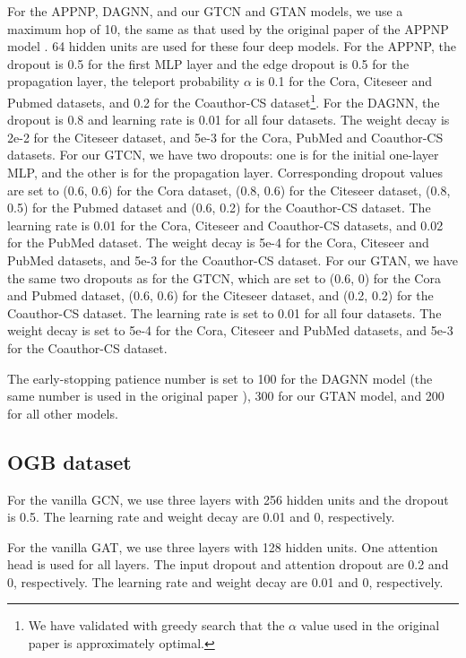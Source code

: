 \documentclass[lettersize,journal]{IEEEtran}
\theoremstyle{plain}
\theoremstyle{definition}
\theoremstyle{remark}
\begin{document}
For the APPNP, DAGNN, and our GTCN and GTAN models, we use a maximum hop of 10, the same as that used by the original paper of the APPNP model \citep{klicpera2018predict}. 64 hidden units are used for these four deep models. For the APPNP, the dropout is 0.5 for the first MLP layer and the edge dropout is 0.5 for the propagation layer, the teleport probability $\alpha$ is 0.1 for the Cora, Citeseer and Pubmed datasets, and 0.2 for the Coauthor-CS dataset\footnote{We have validated with greedy search that the $\alpha$ value used in the original paper is approximately optimal.}. For the DAGNN, the dropout is 0.8 and learning rate is 0.01 for all four datasets. The weight decay is 2e-2 for the Citeseer dataset, and 5e-3 for the Cora, PubMed and Coauthor-CS datasets. For our GTCN, we have two dropouts: one is for the initial one-layer MLP, and the other is for the propagation layer. Corresponding dropout values are set to (0.6, 0.6) for the Cora dataset, (0.8, 0.6) for the Citeseer dataset, (0.8, 0.5) for the Pubmed dataset and (0.6, 0.2) for the Coauthor-CS dataset. The learning rate is 0.01 for the Cora, Citeseer and Coauthor-CS datasets, and 0.02 for the PubMed dataset. The weight decay is 5e-4 for the Cora, Citeseer and PubMed datasets, and 5e-3 for the Coauthor-CS dataset. For our GTAN, we have the same two dropouts as for the GTCN, which are set to (0.6, 0) for the Cora and Pubmed dataset, (0.6, 0.6) for the Citeseer dataset, and (0.2, 0.2) for the Coauthor-CS dataset. The learning rate is set to 0.01 for all four datasets. The weight decay is set to 5e-4 for the Cora, Citeseer and PubMed datasets, and 5e-3 for the Coauthor-CS dataset. 

The early-stopping patience number is set to 100 for the DAGNN model (the same number is used in the original paper \citep{liu2020towards}), 300 for our GTAN model, and 200 for all other models.

\subsection{OGB dataset}
For the vanilla GCN, we use three layers with 256 hidden units and the dropout is 0.5. The learning rate and weight decay are 0.01 and 0, respectively.

For the vanilla GAT, we use three layers with 128 hidden units. One attention head is used for all layers. The input dropout and attention dropout are 0.2 and 0, respectively. The learning rate and weight decay are 0.01 and 0, respectively.
\end{document}
